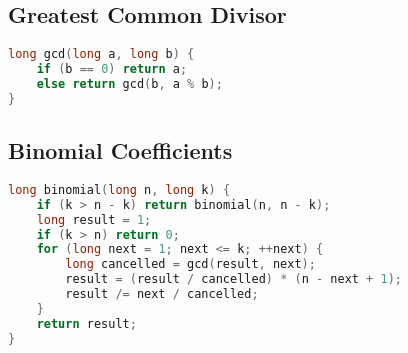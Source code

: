 \subsection{Greatest Common Divisor}

\begin{lstlisting}[language=C++]
long gcd(long a, long b) {
	if (b == 0) return a;
	else return gcd(b, a % b);
}
\end{lstlisting}

\subsection{Binomial Coefficients}

\begin{lstlisting}[language=C++]
long binomial(long n, long k) {
	if (k > n - k) return binomial(n, n - k);
	long result = 1;
	if (k > n) return 0;
	for (long next = 1; next <= k; ++next) {
		long cancelled = gcd(result, next);
		result = (result / cancelled) * (n - next + 1);
		result /= next / cancelled;
	}
	return result;
}
\end{lstlisting}
